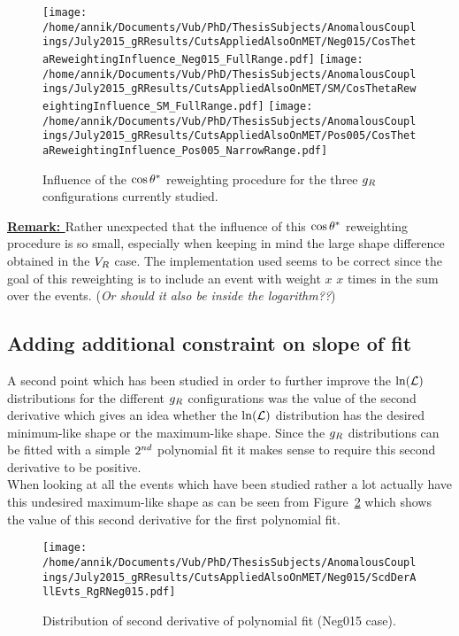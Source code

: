 \begin{figure}[h!t]
 \centering
 \texttt{[image: /home/annik/Documents/Vub/PhD/ThesisSubjects/AnomalousCouplings/July2015\_gRResults/CutsAppliedAlsoOnMET/Neg015/CosThetaReweightingInfluence\_Neg015\_FullRange.pdf]}
 \texttt{[image: /home/annik/Documents/Vub/PhD/ThesisSubjects/AnomalousCouplings/July2015\_gRResults/CutsAppliedAlsoOnMET/SM/CosThetaReweightingInfluence\_SM\_FullRange.pdf]}
 \texttt{[image: /home/annik/Documents/Vub/PhD/ThesisSubjects/AnomalousCouplings/July2015\_gRResults/CutsAppliedAlsoOnMET/Pos005/CosThetaReweightingInfluence\_Pos005\_NarrowRange.pdf]}
 \caption{Influence of the $\cos \theta^{*}$ reweighting procedure for the three $g_{R}$ configurations currently studied.} \label{fig::CosThetaInfluence}
\end{figure}

\textbf{\underline{Remark: }} Rather unexpected that the influence of this $\cos \theta^{*}$ reweighting procedure is so small, especially when keeping in mind the large shape difference obtained in the $V_{R}$ case. The implementation used seems to be correct since the goal of this reweighting is to include an event with weight $x$ $x$ times in the sum over the events. (\textit{Or should it also be inside the logarithm??})

\subsection{Adding additional constraint on slope of fit}
A second point which has been studied in order to further improve the $\ln(\mathcal{L})$ distributions for the different $g_{R}$ configurations was the value of the second derivative which gives an idea whether the $\ln(\mathcal{L})$ distribution has the desired minimum-like shape or the maximum-like shape. Since the $g_{R}$ distributions can be fitted with a simple $2^{nd}$ polynomial fit it makes sense to require this second derivative to be positive.\\
When looking at all the events which have been studied rather a lot actually have this undesired maximum-like shape as can be seen from Figure~\ref{fig::ScdDerAllEvts_Neg015} which shows the value of this second derivative for the first polynomial fit. 

\begin{figure}[h!t]
 \centering
 \texttt{[image: /home/annik/Documents/Vub/PhD/ThesisSubjects/AnomalousCouplings/July2015\_gRResults/CutsAppliedAlsoOnMET/Neg015/ScdDerAllEvts\_RgRNeg015.pdf]}
 \caption{Distribution of second derivative of polynomial fit (Neg015 case).} \label{fig::ScdDerAllEvts_Neg015}
\end{figure}

